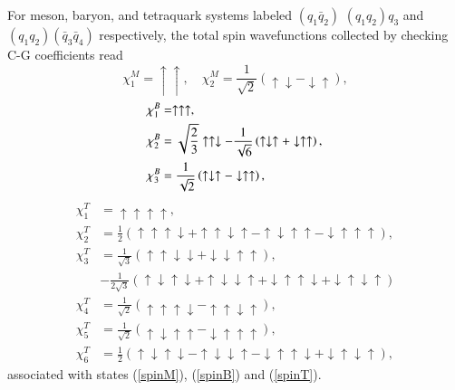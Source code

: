 \documentclass[12pt,onecolumn,floatfix,nofootinbib]{revtex4}
\begin{document}
\label{AppendixB} \setcounter{equation}{0} \renewcommand{\theequation}{B%
\arabic{equation}} For meson, baryon, and tetraquark systems labeled $(q_{1}%
\bar{q}_{2})$ $(q_{1}q_{2})q_{3}$ and $(q_{1}q_{2})(\bar{q}_{3}\bar{q}_{4})$
respectively, the total spin wavefunctions collected by checking C-G
coefficients read
\begin{equation}  \label{pspinM}
\chi_{1}^{M}=\uparrow\uparrow, \quad \chi_{2}^{M}=\frac{1}{\sqrt{2}}
\left(\uparrow\downarrow-\downarrow\uparrow\right),
\end{equation}
\begin{equation}  \label{pspinB}
\begin{aligned} \chi_{1}^{B}&=\uparrow\uparrow\uparrow, \\
\chi_{2}^{B}&=\sqrt{\frac{2}{3}}\uparrow\uparrow\downarrow-\frac{1}{%
\sqrt{6}}
\left(\uparrow\downarrow\uparrow+\downarrow\uparrow\uparrow\right), \\
\chi_{3}^{B}&=\frac{1}{\sqrt{2}}
\left(\uparrow\downarrow\uparrow-\downarrow\uparrow\uparrow\right),
\end{aligned}
\end{equation}
\begin{equation}  \label{pspinT}
\begin{aligned} \chi_{1}^{T}&=\uparrow\uparrow\uparrow\uparrow, \\
\chi_{2}^{T}&=\frac{1}{2}
\left(\uparrow\uparrow\uparrow\downarrow+\uparrow\uparrow\downarrow\uparrow-%
\uparrow\downarrow\uparrow\uparrow-\downarrow\uparrow\uparrow\uparrow%
\right), \\ \chi_{3}^{T}&=\frac{1}{\sqrt{3}}
\left(\uparrow\uparrow\downarrow\downarrow+\downarrow\downarrow\uparrow%
\uparrow\right), \\ &-\frac{1}{2\sqrt{3}}
\left(\uparrow\downarrow\uparrow\downarrow+\uparrow\downarrow\downarrow%
\uparrow+\downarrow\uparrow\uparrow\downarrow+\downarrow\uparrow\downarrow%
\uparrow\right) \\ \chi_{4}^{T}&=\frac{1}{\sqrt{2}}
\left(\uparrow\uparrow\uparrow\downarrow-\uparrow\uparrow\downarrow\uparrow%
\right), \\ \chi_{5}^{T}&=\frac{1}{\sqrt{2}}
\left(\uparrow\downarrow\uparrow\uparrow-\downarrow\uparrow\uparrow\uparrow%
\right), \\ \chi_{6}^{T}&=\frac{1}{2}
\left(\uparrow\downarrow\uparrow\downarrow-\uparrow\downarrow\downarrow%
\uparrow-\downarrow\uparrow\uparrow\downarrow+\downarrow\uparrow\downarrow%
\uparrow\right), \end{aligned}
\end{equation}
associated with states (\ref{spinM}), (\ref{spinB}) and (\ref{spinT}).
\end{document}
